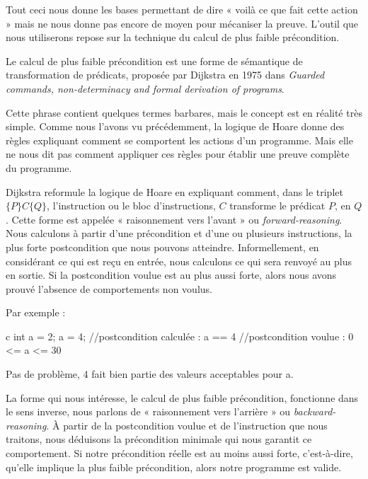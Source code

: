 Tout ceci nous donne les bases permettant de dire « voilà ce que fait cette
action » mais ne nous donne pas encore de moyen pour mécaniser la preuve.
L'outil que nous utiliserons repose sur la technique du calcul de plus
faible précondition.





Le calcul de plus faible précondition est une forme de sémantique de
transformation de prédicats, proposée par Dijkstra en 1975 dans \textit{Guarded
commands, non-determinacy and formal derivation of programs}.



Cette phrase contient quelques termes barbares, mais le concept est en réalité
très simple. Comme nous l'avons vu précédemment, la logique de Hoare donne des
règles expliquant comment se comportent les actions d'un programme. Mais
elle ne nous dit pas comment appliquer ces règles pour établir une preuve
complète du programme.



Dijkstra reformule la logique de Hoare en expliquant comment, dans le triplet
$\{P\}C\{Q\}$, l'instruction ou le bloc d'instructions, $C$ transforme le
prédicat $P$, en $Q$. Cette forme est appelée « raisonnement vers l'avant » ou
\textit{forward-reasoning}. Nous calculons à partir d'une précondition et d'une ou
plusieurs instructions, la plus forte postcondition que nous pouvons
atteindre. Informellement, en considérant ce qui est reçu en entrée, nous
calculons ce qui sera renvoyé au plus en sortie. Si la postcondition voulue
est au plus aussi forte, alors nous avons prouvé l'absence de comportements non
voulus.



Par exemple :

\begin{CodeBlock}{c}
int a = 2;
a = 4;
//postcondition calculée : a == 4
//postcondition voulue   : 0 <= a <= 30
\end{CodeBlock}



Pas de problème, 4 fait bien partie des valeurs acceptables pour a.



La forme qui nous intéresse, le calcul de plus faible précondition, fonctionne
dans le sens inverse, nous parlons de « raisonnement vers l'arrière » ou
\textit{backward-reasoning}. À partir de la postcondition voulue et de
l'instruction que nous traitons, nous déduisons la précondition minimale
qui nous garantit ce comportement. Si notre précondition réelle est au moins
aussi forte, c'est-à-dire, qu'elle implique la plus faible précondition, alors
notre programme est valide.



